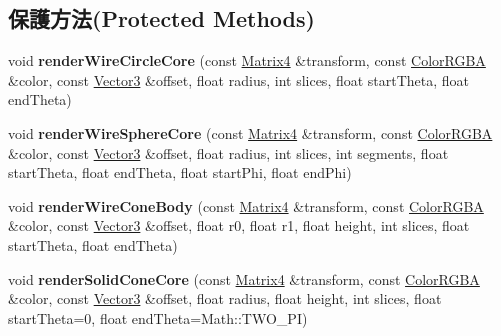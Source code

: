 \subsection*{保護方法(Protected Methods)}
\begin{DoxyCompactItemize}
\item 
void {\bfseries render\+Wire\+Circle\+Core} (const \hyperlink{class_i_dream_sky_1_1_matrix4}{Matrix4} \&transform, const \hyperlink{class_i_dream_sky_1_1_color_r_g_b_a}{Color\+R\+G\+BA} \&color, const \hyperlink{class_i_dream_sky_1_1_vector3}{Vector3} \&offset, float radius, int slices, float start\+Theta, float end\+Theta)\hypertarget{class_i_dream_sky_1_1_i_component_debug_renderer_ac2378fa2554436b2b18b2f501f80a0fa}{}\label{class_i_dream_sky_1_1_i_component_debug_renderer_ac2378fa2554436b2b18b2f501f80a0fa}

\item 
void {\bfseries render\+Wire\+Sphere\+Core} (const \hyperlink{class_i_dream_sky_1_1_matrix4}{Matrix4} \&transform, const \hyperlink{class_i_dream_sky_1_1_color_r_g_b_a}{Color\+R\+G\+BA} \&color, const \hyperlink{class_i_dream_sky_1_1_vector3}{Vector3} \&offset, float radius, int slices, int segments, float start\+Theta, float end\+Theta, float start\+Phi, float end\+Phi)\hypertarget{class_i_dream_sky_1_1_i_component_debug_renderer_ae6684ae1d93748b74353b1e4539ee279}{}\label{class_i_dream_sky_1_1_i_component_debug_renderer_ae6684ae1d93748b74353b1e4539ee279}

\item 
void {\bfseries render\+Wire\+Cone\+Body} (const \hyperlink{class_i_dream_sky_1_1_matrix4}{Matrix4} \&transform, const \hyperlink{class_i_dream_sky_1_1_color_r_g_b_a}{Color\+R\+G\+BA} \&color, const \hyperlink{class_i_dream_sky_1_1_vector3}{Vector3} \&offset, float r0, float r1, float height, int slices, float start\+Theta, float end\+Theta)\hypertarget{class_i_dream_sky_1_1_i_component_debug_renderer_a924cffd2c7414a53e11bf7ef190265ae}{}\label{class_i_dream_sky_1_1_i_component_debug_renderer_a924cffd2c7414a53e11bf7ef190265ae}

\item 
void {\bfseries render\+Solid\+Cone\+Core} (const \hyperlink{class_i_dream_sky_1_1_matrix4}{Matrix4} \&transform, const \hyperlink{class_i_dream_sky_1_1_color_r_g_b_a}{Color\+R\+G\+BA} \&color, const \hyperlink{class_i_dream_sky_1_1_vector3}{Vector3} \&offset, float radius, float height, int slices, float start\+Theta=0, float end\+Theta=Math\+::\+T\+W\+O\+\_\+\+PI)\hypertarget{class_i_dream_sky_1_1_i_component_debug_renderer_a9394b6dd4981ca76578ffd079b59e3a1}{}\label{class_i_dream_sky_1_1_i_component_debug_renderer_a9394b6dd4981ca76578ffd079b59e3a1}


\end{DoxyCompactItemize}
